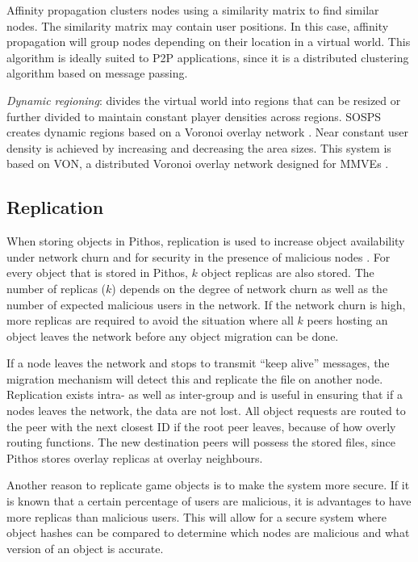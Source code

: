 Affinity propagation clusters nodes using a similarity matrix to find similar nodes. The similarity matrix may contain user positions. In this case,
affinity propagation will group nodes depending on their location in a virtual world. This algorithm is ideally suited to P2P applications, since it
is a distributed clustering algorithm based on message passing.

\emph{Dynamic regioning}: divides the virtual world into regions that can be resized or further divided to maintain constant player densities across
regions. SOSPS creates dynamic regions based on a Voronoi overlay network \cite{voronoi_diagrams_survey}. Near constant user density is achieved by
increasing and decreasing the area sizes. This system is based on VON, a distributed Voronoi overlay network designed for MMVEs \cite{VON_VAST}.

\subsection{Replication}
\label{store_retrieve}

When storing objects in Pithos, replication is used to increase object availability under network churn and for security in the presence of malicious
nodes \cite{storage_and_chaching_PAST}. For every object that is stored in Pithos, $k$ object replicas are also stored. The number of replicas ($k$)
depends on the degree of network churn as well as the number of expected malicious users in the network. If the network churn is high, more replicas
are required to avoid the situation where all $k$ peers hosting an object leaves the network before any object migration can be done.

If a node leaves the network and stops to transmit ``keep alive'' messages, the migration mechanism will detect this and replicate the file on
another node. Replication exists intra- as well as inter-group and is useful in ensuring that if a nodes leaves the network, the data are not lost.
All object requests are routed to the peer with the next closest ID if the root peer leaves, because of how overly routing functions. The new
destination peers will possess the stored files, since Pithos stores overlay replicas at overlay neighbours.

Another reason to replicate game objects is to make the system more secure. If it is known that a certain percentage of users are malicious, it is
advantages to have more replicas than malicious users. This will allow for a secure system where object hashes can be compared to determine which
nodes are malicious and what version of an object is accurate.

